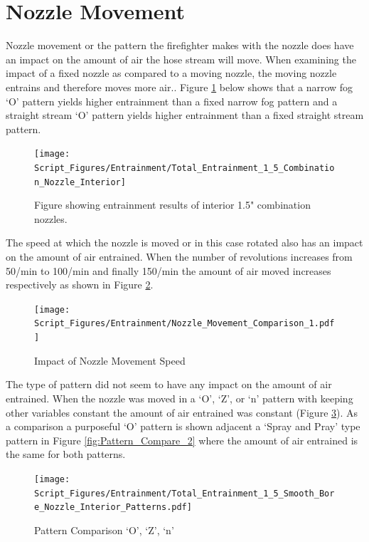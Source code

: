 \documentclass[12pt,oneside]{book}
\begin{document}
\section{Nozzle Movement}
Nozzle movement or the pattern the firefighter makes with the nozzle does have an impact on the amount of air the hose stream will move. When examining the impact of a fixed nozzle as compared to a moving nozzle, the moving nozzle entrains and therefore moves more air..  Figure \ref{fig:1_5_Interior_Combination_Results_Nozzle_Movements} below shows that a narrow fog `O' pattern yields higher entrainment than a fixed narrow fog pattern and a straight stream `O' pattern yields higher entrainment than a fixed straight stream pattern. 

\begin{figure}[!ht]
	\centering
	\texttt{[image: Script\_Figures/Entrainment/Total\_Entrainment\_1\_5\_Combination\_Nozzle\_Interior]}
	\caption{Figure showing entrainment results of interior 1.5" combination nozzles.}
	\label{fig:1_5_Interior_Combination_Results_Nozzle_Movements}
\end{figure}

The speed at which the nozzle is moved or in this case rotated also has an impact on the amount of air entrained. When the number of revolutions increases from 50/min to 100/min and finally 150/min the amount of air moved increases respectively as shown in Figure \ref{fig:Nozzle_Move_1}.

\begin{figure}[!ht]
\centering
\texttt{[image: Script\_Figures/Entrainment/Nozzle\_Movement\_Comparison\_1.pdf]}
\caption{Impact of Nozzle Movement Speed}
\label{fig:Nozzle_Move_1}
\end{figure}

The type of pattern did not seem to have any impact on the amount of air entrained. When the nozzle was moved in a `O', `Z', or `n' pattern with keeping other variables constant the amount of air entrained was constant (Figure \ref{fig:Pattern_Compare_1}). As a comparison a purposeful `O' pattern is shown adjacent a `Spray and Pray' type pattern in Figure \ref{fig:Pattern_Compare_2} where the amount of air entrained is the same for both patterns. 

\begin{figure}[!ht]
\centering
\texttt{[image: Script\_Figures/Entrainment/Total\_Entrainment\_1\_5\_Smooth\_Bore\_Nozzle\_Interior\_Patterns.pdf]}
\caption{Pattern Comparison `O', `Z', `n'}
\label{fig:Pattern_Compare_1}
\end{figure}
\end{document}
